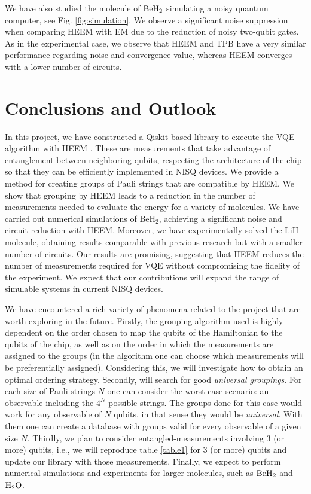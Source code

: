 \documentclass[11pt, twocolumn]{article}
\begin{document}
We have also studied the molecule of ${\rm BeH_2}$ simulating a noisy quantum computer, see Fig. \ref{fig:simulation}. We observe a significant noise suppression when comparing HEEM with EM due to the reduction of noisy two-qubit gates. As in the experimental case, we observe that HEEM and TPB have a very similar performance regarding noise and convergence value, whereas HEEM converges with a lower number of circuits.

\section{Conclusions and Outlook}
In this project, we have constructed a Qiskit-based library to execute the VQE algorithm with HEEM \cite{github}. These are measurements that take advantage of entanglement between neighboring qubits, respecting the architecture of the chip so that they can be efficiently implemented in NISQ devices. We provide a method for creating groups of Pauli strings that are compatible by HEEM. We show that grouping by HEEM leads to a reduction in the number of measurements needed to evaluate the energy for a variety of molecules. We have carried out numerical simulations of $\text{BeH}_2$, achieving a significant noise and circuit reduction with HEEM. Moreover, we have experimentally solved the LiH molecule, obtaining results comparable with previous research but with a smaller number of circuits. Our results are promising, suggesting that HEEM reduces the number of measurements required for VQE without compromising the fidelity of the experiment. We expect that our contributions will expand the range of simulable systems in current NISQ devices. 

We have encountered a rich variety of phenomena related to the project that are worth exploring in the future. Firstly, the grouping algorithm used is highly dependent on the order chosen to map the qubits of the Hamiltonian to the qubits of the chip, as well as on the order in which the measurements are assigned to the groups (in the algorithm one can choose which measurements will be preferentially assigned). Considering this, we will investigate how to obtain an optimal ordering strategy. Secondly, will search for good \textit{universal groupings}. For each size of Pauli strings $N$ one can consider the worst case scenario: an observable including the $4^N$ possible strings. The groups done for this case would work for any observable of $N$ qubits, in that sense they would be \textit{universal}. With them one can create a database with groups valid for every observable of a given size $N$. Thirdly, we plan to consider entangled-measurements involving 3 (or more) qubits, i.e., we will reproduce table \ref{table1} for 3 (or more) qubits and update our library with those measurements. Finally, we expect to perform numerical simulations and experiments for larger molecules, such as ${\rm BeH_2}$ and ${\rm H_2O}$.\\
\end{document}
